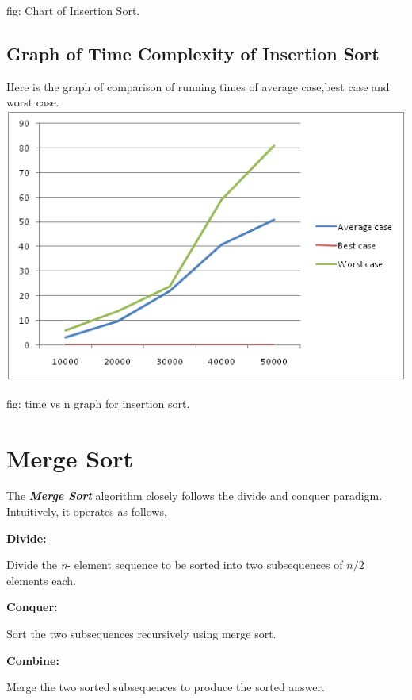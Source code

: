 \documentclass[9 pt]{report}
\begin{document}
\hspace{5cm}fig: Chart of Insertion Sort.

\subsection{\huge Graph of Time Complexity of Insertion Sort}

Here is the graph of  comparison of running times of average case,best case and worst case.\\


\includegraphics{img-1.png}

\hspace{4cm}fig: time vs n graph for insertion sort.


\section{\huge Merge Sort}

The \textbf{\textit{Merge Sort}} algorithm closely follows the divide and conquer paradigm. Intuitively, it operates as follows,
\vspace{0.5cm}

\textbf{Divide:}

Divide the \textit{n}- element sequence to be sorted into two subsequences of $n/2$ elements  each.
\vspace{0.5cm}

\textbf{Conquer:}

Sort the two subsequences recursively using merge sort.
\vspace{0.5cm}

\textbf{Combine:}

Merge the two sorted subsequences to produce the sorted answer.
\vspace{0.5cm}
\end{document}
